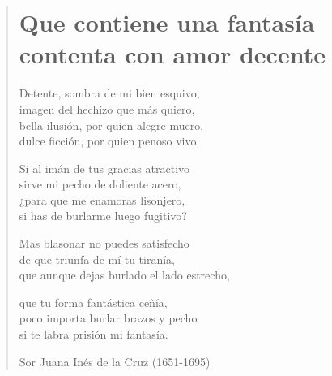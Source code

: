 \documentclass[12pt, twoside]{book}
\begin{document}
\newpage
\begin{verse}
\begin{center}
\section{Que contiene una fantasía contenta con amor decente}
\end{center}
Detente, sombra de mi bien esquivo,\\
imagen del hechizo que más quiero,\\
bella ilusión, por quien alegre muero,\\
dulce ficción, por quien penoso vivo.
\newline

Si al imán de tus gracias atractivo\\
sirve mi pecho de doliente acero,\\
¿para que me enamoras lisonjero,\\
si has de burlarme luego fugitivo?
\newline

Mas blasonar no puedes satisfecho\\
de que triunfa de mí tu tiranía,\\
que aunque dejas burlado el lado estrecho,
\newline

 que tu forma fantástica ceñía,\\
 poco importa burlar brazos y pecho\\
 si te labra prisión mi fantasía.
 \newline

Sor Juana Inés de la Cruz (1651-1695)
\end{verse}
\end{document}
